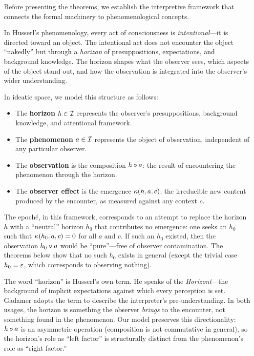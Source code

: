 Before presenting the theorems, we establish the interpretive framework
that connects the formal machinery to phenomenological concepts.

In Husserl's phenomenology, every act of consciousness is
\emph{intentional}---it is directed toward an object. The intentional
act does not encounter the object ``nakedly'' but through a
\emph{horizon} of presuppositions, expectations, and background
knowledge. The horizon shapes what the observer sees, which aspects of
the object stand out, and how the observation is integrated into the
observer's wider understanding.

In ideatic space, we model this structure as follows:
\begin{itemize}
\item The \textbf{horizon} $h \in \mathcal{I}$ represents the observer's
presuppositions, background knowledge, and attentional framework.
\item The \textbf{phenomenon} $a \in \mathcal{I}$ represents the object of
observation, independent of any particular observer.
\item The \textbf{observation} is the composition $h \circ a$:
the result of encountering the phenomenon through the horizon.
\item The \textbf{observer effect} is the emergence
$\kappa(h, a, c)$: the irreducible new content produced by the
encounter, as measured against any context $c$.
\end{itemize}

The epoch\'e, in this framework, corresponds to an attempt to replace
the horizon $h$ with a ``neutral'' horizon $h_0$ that contributes no
emergence: one seeks an $h_0$ such that $\kappa(h_0, a, c) = 0$ for
all $a$ and $c$. If such an $h_0$ existed, then the observation
$h_0 \circ a$ would be ``pure''---free of observer contamination.
The theorems below show that no such $h_0$ exists in general (except
the trivial case $h_0 = \varepsilon$, which corresponds to observing
nothing).

The word ``horizon'' is Husserl's own term. He speaks of the
\emph{Horizont}---the background of implicit expectations against which
every perception is set. Gadamer adopts the term to describe the
interpreter's pre-understanding. In both usages, the horizon is
something the observer \emph{brings} to the encounter, not something
found in the phenomenon. Our model preserves this directionality:
$h \circ a$ is an asymmetric operation (composition is not
commutative in general), so the horizon's role as ``left factor'' is
structurally distinct from the phenomenon's role as ``right factor.''

